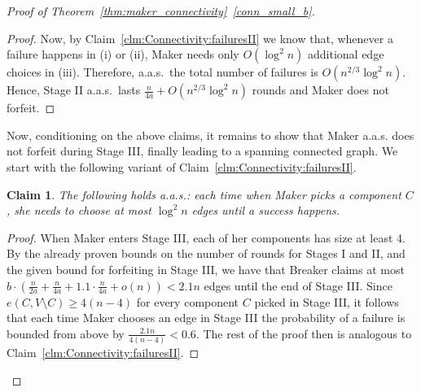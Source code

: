 \documentclass[11pt, a4paper]{article}
\numberwithin{equation}{section}
\numberwithin{figure}{section}
\newtheorem{claim}[theorem]{Claim}
\begin{document}
\begin{proof}[Proof of Theorem~\ref{thm:maker_connectivity}~\ref{conn_small_b}]
\begin{proof}
Now, by Claim~\ref{clm:Connectivity:failuresII}
we know that, whenever a failure happens in (i) or (ii), Maker needs only $O(\log^2 n)$ additional edge choices in (iii). Therefore, a.a.s.~the total number of
failures is $O(n^{2/3}\log^2 n)$. Hence, Stage II a.a.s.~lasts $\frac{n}{4a} + O(n^{2/3}\log^2 n)$
rounds and Maker does not forfeit. 
\end{proof}

\smallskip

Now, conditioning on the above claims, it remains to show that Maker a.a.s. does not forfeit during Stage III, finally leading to a spanning connected graph. 
We start with the following variant of Claim~\ref{clm:Connectivity:failuresII}.

\begin{claim}\label{clm:Connectivity:failuresIII}
The following holds a.a.s.:
each time when Maker picks a component $C$,
she needs to choose at most $\log^2 n$ edges until
a success happens.
\end{claim}

\begin{proof}
When Maker enters Stage III, each of her components has size at least 4. 
By the already proven bounds on the number of rounds
for Stages I and II, and the given bound for forfeiting in Stage III, we have that
Breaker claims at most 
$b\cdot \left(\frac{n}{2a} + \frac{n}{4a} + 1.1\cdot \frac{n}{4a} + o(n)\right) < 2.1n$ 
edges until the end of Stage III. Since $e(C,V\setminus C)\geq 4(n-4)$ for every component $C$ picked in Stage III, it follows that each time Maker chooses an edge in Stage III
the probability of a failure is bounded from above by
$\frac {2.1n}{4(n-4)} < 0.6$. The rest of the proof then is analogous to Claim~\ref{clm:Connectivity:failuresII}.
\end{proof}


\end{proof}
\end{document}
